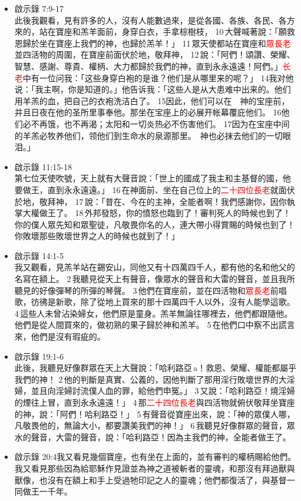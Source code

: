 \begin{itemize}
\item 啟示錄 7:9-17 \\
此後我觀看，見有許多的人，沒有人能數過來，是從各國、各族、各民、各方來的，站在寶座和羔羊面前，身穿白衣，手拿棕樹枝， 10 大聲喊著說：「願救恩歸於坐在寶座上我們的神，也歸於羔羊！」 11 眾天使都站在寶座和\textcolor{red}{眾長老}並四活物的周圍，在寶座前面伏於地，敬拜神， 12 說：「阿們！頌讚、榮耀、智慧、感謝、尊貴、權柄、大力都歸於我們的神，直到永永遠遠！阿們。」\textcolor{red}{长老}中有一位问我：「这些身穿白袍的是谁？他们是从哪里来的呢？」 14我对他说：「我主啊，你是知道的。」他告诉我：「这些人是从大患难中出来的。他们用羊羔的血，把自己的衣袍洗洁白了。 15因此，他们可以在　神的宝座前，并且日夜在他的圣所里事奉他。那坐在宝座上的必展开帐幕覆庇他们。 16他们必不再饿，也不再渴；太阳和一切炎热必不伤害他们。 17因为在宝座中间的羊羔必牧养他们，领他们到生命水的泉源那里。　神也必抹去他们的一切眼泪。」
\item 啟示錄 11:15-18\\
第七位天使吹號，天上就有大聲音說：「世上的國成了我主和主基督的國，他要做王，直到永永遠遠。」 16 在神面前、坐在自己位上的\textcolor{red}{二十四位長老}就面伏於地，敬拜神， 17 說：「昔在、今在的主神，全能者啊！我們感謝你，因你執掌大權做王了。 18 外邦發怒，你的憤怒也臨到了！審判死人的時候也到了！你的僕人眾先知和眾聖徒，凡敬畏你名的人，連大帶小得賞賜的時候也到了！你敗壞那些敗壞世界之人的時候也就到了！」
\item 啟示錄 14:1-5\\
我又觀看，見羔羊站在錫安山，同他又有十四萬四千人，都有他的名和他父的名寫在額上。 2 我聽見從天上有聲音，像眾水的聲音和大雷的聲音，並且我所聽見的好像彈琴的所彈的琴聲。 3 他們在寶座前，並在四活物和\textcolor{red}{眾長老}前唱歌，彷彿是新歌，除了從地上買來的那十四萬四千人以外，沒有人能學這歌。 4 這些人未曾沾染婦女，他們原是童身。羔羊無論往哪裡去，他們都跟隨他。他們是從人間買來的，做初熟的果子歸於神和羔羊。 5 在他們口中察不出謊言來，他們是沒有瑕疵的。
\item 啟示錄 19:1-6\\
此後，我聽見好像群眾在天上大聲說：「哈利路亞 a！救恩、榮耀、權能都屬乎我們的神！ 2 他的判斷是真實、公義的，因他判斷了那用淫行敗壞世界的大淫婦，並且向淫婦討流僕人血的罪，給他們申冤。」 3 又說：「哈利路亞！燒淫婦的煙往上冒，直到永永遠遠！」 4 那\textcolor{red}{二十四位長老}與四活物就俯伏敬拜坐寶座的神，說：「阿們！哈利路亞！」 5 有聲音從寶座出來，說：「神的眾僕人哪，凡敬畏他的，無論大小，都要讚美我們的神！」 6 我聽見好像群眾的聲音，眾水的聲音，大雷的聲音，說：「哈利路亞！因為主我們的神，全能者做王了。
\item 啟示錄 20:4我又看見幾個寶座，也有坐在上面的，並有審判的權柄賜給他們。我又看見那些因為給耶穌作見證並為神之道被斬者的靈魂，和那沒有拜過獸與獸像，也沒有在額上和手上受過牠印記之人的靈魂；他們都復活了，與基督一同做王一千年。 
\end{itemize}

